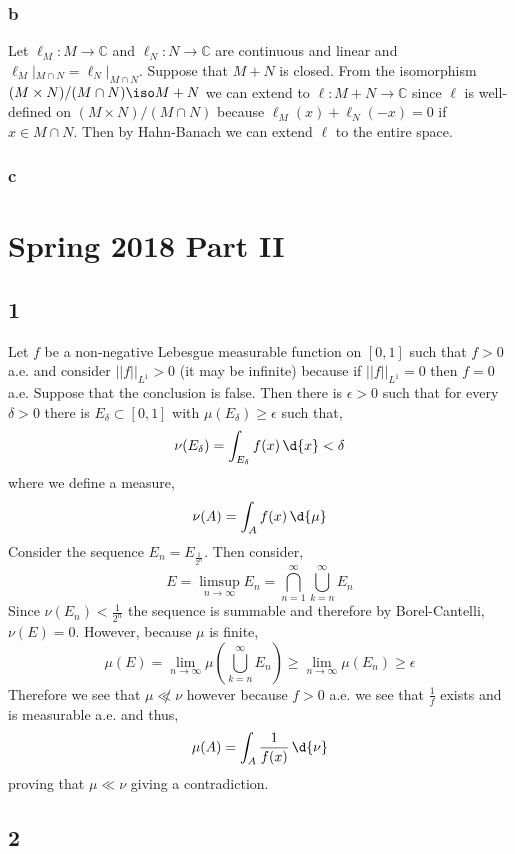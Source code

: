 \documentclass[12pt]{article}
\renewcommand{\C}{\mathbb{C}}
\begin{document}
\subsubsection{b}


Let $\ell_M : M \to \C$ and $\ell_N : N \to \C$ are continuous and linear and $\ell_M |_{M \cap N} = \ell_N |_{M \cap N}$. Suppose that $M + N$ is closed. From the isomorphism $(M \times N)/(M \cap N) \iso M + N$ we can extend to $\ell : M + N \to \C$ since $\ell$ is well-defined on $(M \times N)/(M \cap N)$ because $\ell_M(x) + \ell_N(-x) = 0$ if $x \in M \cap N$. Then by Hahn-Banach we can extend $\ell$ to the entire space. 

\subsubsection{c}

\section{Spring 2018 Part II}

\subsection{1}

Let $f$ be a non-negative Lebesgue measurable function on $[0,1]$ such that $f > 0$ a.e. and consider $|| f ||_{L^1} > 0$ (it may be infinite) because if $|| f ||_{L^1} = 0$ then $f = 0$ a.e. Suppose that the conclusion is false. Then there is $\epsilon > 0$ such that for every $\delta > 0$ there is $E_\delta \subset [0,1]$ with $\mu(E_\delta) \ge \epsilon$ such that,
\[ \nu(E_\delta) = \int_{E_\delta} f(x) \, \d{x} < \delta \]
where we define a measure,
\[ \nu(A) = \int_A f(x) \, \d{\mu} \]
Consider the sequence $E_n = E_{\frac{1}{2^n}}$. Then consider,
\[ E = \limsup_{n \to \infty} E_n = \bigcap_{n = 1}^\infty \bigcup_{k = n}^\infty E_n \]
Since $\nu(E_n) < \frac{1}{2^n}$ the sequence is summable and therefore by Borel-Cantelli, $\nu(E) = 0$. However, because $\mu$ is finite,
\[ \mu(E) = \lim_{n \to \infty} \mu \left( \bigcup_{k = n}^\infty E_n \right) \ge \lim_{n \to \infty} \mu(E_n) \ge \epsilon \]
Therefore we see that $\mu \not\ll \nu$ however because $f > 0$ a.e. we see that $\frac{1}{f}$ exists and is measurable a.e. and thus,
\[ \mu(A) = \int_{A} \frac{1}{f(x)} \, \d{\nu} \]
proving that $\mu \ll \nu$ giving a contradiction.

\subsection{2}
\end{document}
